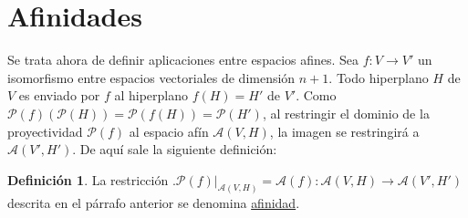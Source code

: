 \documentclass[12pt]{report}
\theoremstyle{definition}
\newtheorem{definition}{Definición}[chapter]
\theoremstyle{definition}
\theoremstyle{remark}
\begin{document}
\section{Afinidades}
Se trata ahora de definir aplicaciones entre espacios afines. Sea $f \colon V \to V'$ un isomorfismo entre espacios vectoriales de dimensión $n+1$. Todo hiperplano $H$ de $V$ es enviado por $f$ al hiperplano $f(H) = H'$ de $V'$. Como $\mathcal{P}(f)(\mathcal{P}(H)) = \mathcal{P}(f(H)) = \mathcal{P}(H')$, al restringir el dominio de la proyectividad $\mathcal{P}(f)$ al espacio afín $\mathcal{A}(V,H)$, la imagen se restringirá a $\mathcal{A}(V',H')$. De aquí sale la siguiente definición:

\begin{definition}
La restricción $\bigl.\mathcal{P}(f)\bigr|_{\mathcal{A}(V,H)} = \mathcal{A}(f) \colon \mathcal{A}(V,H) \to \mathcal{A}(V',H')$ descrita en el párrafo anterior se denomina \ul{afinidad}.
\end{definition}
\end{document}
